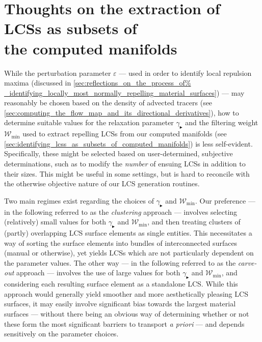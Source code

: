 \section[Thoughts on the extraction of LCSs as subsets of the computed manifolds]
{Thoughts on the extraction of LCSs as subsets of \\\phantom{5.5}
 the computed manifolds}
\label{sec:thoughts_on_the_extraction_of_lcss_as_subsets_of_the_computed%
_manifolds}

While the perturbation parameter $\varepsilon$ --- used in order to identify
local repulsion maxima (discussed in \cref{sec:reflections_on_the_process_of%
_identifying_locally_most_normally_repelling_material_surfaces}) --- may
reasonably be chosen based on the density of advected tracers (see
\cref{sec:computing_the_flow_map_and_its_directional_derivatives}), how to
determine suitable values for the relaxation parameter
$\gamma_{\blacktriangleright}$ and the filtering weight $\mathcal{W}_{\min}$
used to extract repelling LCSs from our computed manifolds (see
\cref{sec:identifying_lcss_as_subsets_of_computed_manifolds}) is less
self-evident. Specifically, these might be selected based on user-determined,
subjective determinations, such as to modify the \emph{number} of ensuing LCSs
in addition to their sizes. This might be useful in some settings, but is hard
to reconcile with the otherwise objective nature of our LCS generation
routines.

Two main regimes exist regarding the choices of
$\gamma_{\blacktriangleright}$ and $\mathcal{W}_{\min}$. Our preference --- in
the following referred to as the \emph{clustering} approach --- involves
selecting (relatively) small values for both $\gamma_{\blacktriangleright}$
and $\mathcal{W}_{\min}$, and then treating clusters of (partly) overlapping
LCS surface elements as single entities. This necessitates a way of sorting the
surface  elements into bundles of interconnected surfaces
(manual or otherwise), yet yields LCSs which are not particularly dependent on
the parameter values. The other way --- in the following referred to as the
\emph{carve-out} approach --- involves the use of large values for both
$\gamma_{\blacktriangleright}$ and $\mathcal{W}_{\min}$, and considering each
resulting surface element as a standalone LCS. While this approach would
generally yield smoother and more aesthetically pleasing LCS surfaces, it may
easily involve significant bias towards the largest material surfaces ---
without there being an obvious way of determining whether or not these form the
most significant barriers to transport \emph{a priori} --- and depends
sensitively on the parameter choices.

